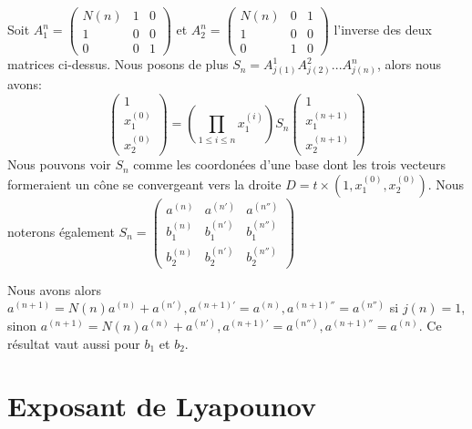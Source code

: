 \documentclass[12pt]{article}
\theoremstyle{plain}%
\theoremstyle{definition}
\theoremstyle{remark}
\begin{document}
Soit $A_1^n=\begin{pmatrix} N(n) & 1 & 0 \\1 & 0 & 0 \\0 & 0 & 1 \end{pmatrix}$ et $A_2^n=\begin{pmatrix} N(n) & 0 & 1 \\1 & 0 & 0 \\0 & 1 & 0 \end{pmatrix}$ l'inverse des deux matrices ci-dessus. Nous posons de plus $S_n=A_{j(1)}^1 A_{j(2)}^2 ... A_{j(n)}^n$, alors nous avons:$$
\begin{pmatrix} 1 \\ x_1^{(0)} \\ x_2^{(0)} \end{pmatrix} = (\prod_{1 \leq i \leq n} x_1^{(i)})S_n \begin{pmatrix} 1 \\ x_1^{(n+1)} \\ x_2^{(n+1)} \end{pmatrix}
$$
Nous pouvons voir $S_n$ comme les coordonées d'une base dont les trois vecteurs formeraient un cône se convergeant vers la droite $D=t \times (1,x_1^{(0)},x_2^{(0)})$. \newline
Nous noterons également $S_n=\begin{pmatrix} a^{(n)} & a^{(n')} & a^{(n'')} \\ b_1^{(n)} & b_1^{(n')} & b_1^{(n'')} \\ b_2^{(n)} & b_2^{(n')} & b_2^{(n'')} \end{pmatrix}$ \newline

Nous avons alors $a^{(n+1)}=N(n)a^{(n)}+a^{(n')},a^{(n+1)'}=a^{(n)},a^{(n+1)''}=a^{(n'')}$ si $j(n)=1$, sinon $a^{(n+1)}=N(n)a^{(n)}+a^{(n')},a^{(n+1)'}=a^{(n'')},a^{(n+1)''}=a^{(n)}$. Ce résultat vaut aussi pour $b_1$ et $b_2$.

\section{Exposant de Lyapounov}
\end{document}
